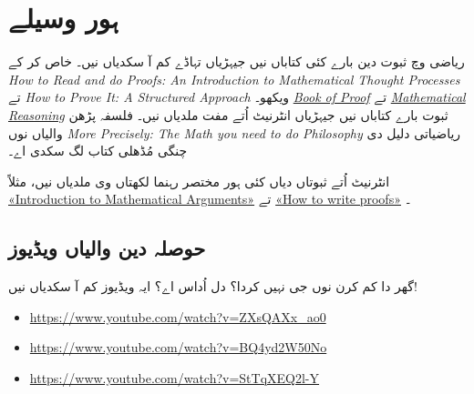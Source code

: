 \documentclass[../../../include/open-logic-section]{subfiles}
\begin{document}

\section{ہور وسیلے}

ریاضی وچ ثبوت دین بارے کئی کتاباں نیں جیہڑیاں تہاڈے کم آ سکدیاں نیں۔ خاص کر کے \emph{How to Read and do Proofs: An Introduction to
Mathematical Thought Processes} \citep{Solow2013} تے \emph{How to
Prove It: A Structured Approach} \citep{Velleman2019} ویکھو۔
\href{http://www.people.vcu.edu/~rhammack/BookOfProof/BookOfProof.pdf}{\emph{Book
of Proof}} \citep{Hammack2013} تے
\href{https://scholarworks.gvsu.edu/books/7/}{\emph{Mathematical
Reasoning}} \citep{Sandstrum2019} ثبوت بارے کتاباں نیں جیہڑیاں انٹرنیٹ اُتے مفت ملدیاں نیں۔ فلسفہ پڑھن والیاں نوں \emph{More
Precisely: The Math you need to do Philosophy} \citep{Steinhart2018} ریاضیاتی دلیل دی چنگی مُڈھلی کتاب لگ سکدی اے۔

انٹرنیٹ اُتے ثبوتاں دیاں کئی ہور مختصر رہنما لکھتاں وی ملدیاں نیں، مثلاً
\href{https://math.berkeley.edu/~hutching/teach/proofs.pdf}{«Introduction
  to Mathematical Arguments»} \citep{Hutchings2003} تے
\href{https://eugeniacheng.com/wp-content/uploads/2017/02/cheng-proofguide.pdf}{«How to
  write proofs»} \citep{Cheng2004}۔

\subsection{حوصلہ دین والیاں ویڈیوز}

گھر دا کم کرن نوں جی نہیں کردا؟ دل اُداس اے؟ ایہ ویڈیوز کم آ سکدیاں نیں!

\begin{itemize}
\item \url{https://www.youtube.com/watch?v=ZXsQAXx_ao0}
\item \url{https://www.youtube.com/watch?v=BQ4yd2W50No}
\item \url{https://www.youtube.com/watch?v=StTqXEQ2l-Y}
\end{itemize}
\end{document}
